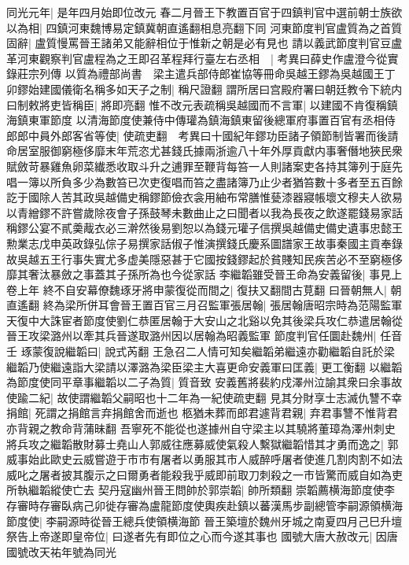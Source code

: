 同光元年|{
	是年四月始即位改元}
春二月晉王下教置百官于四鎮判官中選前朝士族欲以為相|{
	四鎮河東魏博易定鎮冀朝直遙翻相息亮翻下同}
河東節度判官盧質為之首質固辭|{
	盧質慢罵晉王諸弟又能辭相位于惟新之朝是必有見也}
請以義武節度判官豆盧革河東觀察判官盧程為之王即召革程拜行臺左右丞相　|{
	考異曰薛史作盧澄今從實錄莊宗列傳}
以質為禮部尚書　梁主遣兵部侍郎崔協等冊命吳越王鏐為吳越國王丁卯鏐始建國儀衛名稱多如天子之制|{
	稱尺證翻}
謂所居曰宫殿府署曰朝廷教令下統内曰制敕將吏皆稱臣|{
	將即亮翻}
惟不改元表疏稱吳越國而不言軍|{
	以建國不肯復稱鎮海鎮東軍節度}
以清海節度使兼侍中傳瓘為鎮海鎮東留後總軍府事置百官有丞相侍郎郎中員外郎客省等使|{
	使疏吏翻　考異曰十國紀年鏐功臣諸子領節制皆署而後請命居室服御窮極侈靡末年荒恣尤甚錢氏據兩浙逾八十年外厚貢獻内事奢僭地狹民衆賦斂苛暴雞魚卵菜纎悉收取斗升之逋罪至鞭背每笞一人則諸案吏各持其簿列于庭先唱一簿以所負多少為數笞已次吏復唱而笞之盡諸簿乃止少者猶笞數十多者至五百餘訖于國除人苦其政吳越備史稱鏐節儉衣衾用紬布常膳惟甆漆器寢帳壞文穆夫人欲易以青繒鏐不許嘗歲除夜會子孫鼓琴未數曲止之曰聞者以我為長夜之飲遂罷錢易家話稱鏐公宴不貳羮胾衣必三澣然後易劉恕以為錢元瓘子信撰吳越備史備史遺事忠懿王勲業志戊申英政錄弘倧子易撰家話俶子惟演撰錢氏慶系圖譜家王故事秦國主貢奉錄故吳越五王行事失實尤多虚美隱惡甚于它國按錢鏐起於貧賤知民疾苦必不至窮極侈靡其奢汰暴斂之事蓋其子孫所為也今從家話}
李繼韜雖受晉王命為安義留後|{
	事見上卷上年}
終不自安幕僚魏琢牙將申蒙復從而間之|{
	復扶又翻間古莧翻}
曰晉朝無人|{
	朝直遙翻}
終為梁所併耳會晉王置百官三月召監軍張居翰|{
	張居翰唐昭宗時為范陽監軍天復中大誅宦者節度使劉仁恭匿居翰于大安山之北谿以免其後梁兵攻仁恭遣居翰從晉王攻梁潞州以牽其兵晉遂取潞州因以居翰為昭義監軍}
節度判官任圜赴魏州|{
	任音壬}
琢蒙復說繼韜曰|{
	說式芮翻}
王急召二人情可知矣繼韜弟繼遠亦勸繼韜自託於梁繼韜乃使繼遠詣大梁請以澤潞為梁臣梁主大喜更命安義軍曰匡義|{
	更工衡翻}
以繼韜為節度使同平章事繼韜以二子為質|{
	質音致}
安義舊將裴約戍澤州泣諭其衆曰余事故使踰二紀|{
	故使謂繼韜父嗣昭也十二年為一紀使疏吏翻}
見其分財享士志滅仇讐不幸捐館|{
	死謂之捐館言弃捐館舍而逝也}
柩猶未葬而郎君遽背君親|{
	弃君事讐不惟背君亦背親之教命背蒲昧翻}
吾寧死不能從也遂據州自守梁主以其驍將董璋為澤州刺史將兵攻之繼韜散財募士堯山人郭威往應募威使氣殺人繫獄繼韜惜其才勇而逸之|{
	郭威事始此歐史云威嘗遊于市市有屠者以勇服其市人威醉呼屠者使進几割肉割不如法威叱之屠者披其腹示之曰爾勇者能殺我乎威即前取刀刺殺之一市皆驚而威自如為吏所執繼韜縱使亡去}
契丹寇幽州晉王問帥於郭崇韜|{
	帥所類翻}
崇韜薦横海節度使李存審時存審臥病己卯徙存審為盧龍節度使輿疾赴鎮以蕃漢馬步副總管李嗣源領横海節度使|{
	李嗣源時從晉王總兵使領横海節}
晉王築壇於魏州牙城之南夏四月己巳升壇祭告上帝遂即皇帝位|{
	曰遂者先有即位之心而今遂其事也}
國號大唐大赦改元|{
	因唐國號改天祐年號為同光}
